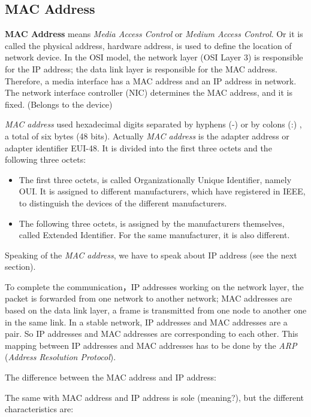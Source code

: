 \subsection{MAC Address}

\textbf{MAC Address} means \textit{Media Access Control} or \textit{Medium Access Control}. Or it is called the physical address, hardware address, is used to define the location of network device. In the OSI model, the network layer (OSI Layer 3) is responsible for the IP address; the data link layer is responsible for the MAC address. Therefore, a media interface has a MAC address and an IP address in network. The network interface controller (NIC) determines the MAC address, and it is fixed. (Belongs to the device)  

\textit{MAC address} used hexadecimal digits separated by hyphens (-) or by colons (:) , a total of six bytes (48 bits). Actually \textit{MAC address} is the adapter address or adapter identifier EUI-48. It is divided into the first three octets and the following three octets:  

\begin{itemize}
	\item The first three octets, is called Organizationally Unique Identifier, namely OUI. It is assigned to different manufacturers, which have registered in IEEE, to distinguish the devices of the different manufacturers.
	\item The following three octets, is assigned by the manufacturers themselves, called Extended Identifier. For the same manufacturer, it is also different.
\end{itemize}

Speaking of the \textit{MAC address}, we have to speak about IP address (see the next section).

To complete the communication，IP addresses working on the network layer, the packet is forwarded from one network to another network; MAC addresses are based on the data link layer, a frame is transmitted from one node to another one in the same link. In a stable network, IP addresses and MAC addresses are a pair. So IP addresses and MAC addresses are corresponding to each other. This mapping between IP addresses and MAC addresses has to be done by the \textit{ARP} (\textit{Address Resolution Protocol}).  

The difference between the MAC address and IP address:  

The same with MAC address and IP address is sole (meaning?), but the different characteristics are:  

